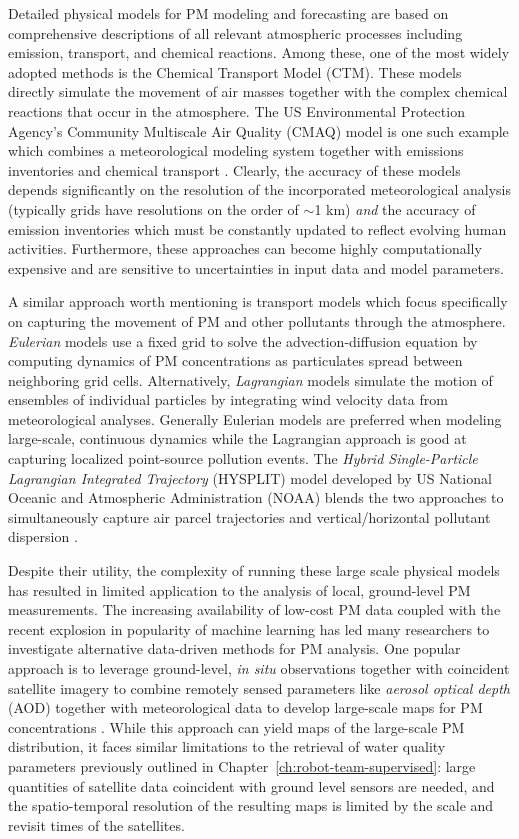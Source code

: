 Detailed physical models for PM modeling and forecasting are based on
comprehensive descriptions of all relevant atmospheric processes including
emission, transport, and chemical reactions. Among these, one of the most widely
adopted methods is the Chemical Transport Model (CTM). These models directly simulate
the movement of air masses together with the complex chemical reactions that occur in the
atmosphere. The US Environmental Protection Agency's Community Multiscale Air
Quality (CMAQ) model is one such example which combines a meteorological
modeling system together with emissions inventories and chemical transport
\cite{cmaq-overview}. Clearly, the accuracy of these models depends
significantly on the resolution of the incorporated meteorological analysis
(typically grids have resolutions on the order of $\sim$1 km) \textit{and}
the accuracy of emission inventories which must be constantly updated to reflect
evolving human activities. Furthermore, these approaches can become highly
computationally expensive and are sensitive to uncertainties in input data
and model parameters.

A similar approach worth mentioning is transport models which focus specifically
on capturing the movement of PM and other pollutants through the atmosphere.
\textit{Eulerian} models use a fixed grid to solve the advection-diffusion
equation by computing dynamics of PM concentrations as particulates spread
between neighboring grid cells. Alternatively, \textit{Lagrangian} models
simulate the motion of ensembles of individual particles by integrating wind
velocity data from meteorological analyses. Generally Eulerian models are
preferred when modeling large-scale, continuous dynamics while the Lagrangian
approach is good at capturing localized point-source pollution events. The
\textit{Hybrid Single-Particle Lagrangian Integrated Trajectory} (HYSPLIT) model
developed by US National Oceanic and Atmospheric Administration (NOAA) blends
the two approaches to simultaneously capture air parcel trajectories and
vertical/horizontal pollutant dispersion
\cite{hysplit-overview}.

Despite their utility, the complexity of running these large scale physical
models has resulted in limited application to the analysis of local,
ground-level PM measurements. The increasing availability of low-cost PM data
coupled with the recent explosion in popularity of machine learning has led
many researchers to investigate alternative data-driven methods for PM
analysis. One popular approach is to leverage ground-level, \textit{in situ}
observations together with coincident satellite imagery to combine remotely sensed
parameters like \textit{aerosol optical depth} (AOD) together with
meteorological data to develop large-scale maps for PM concentrations
\cite{prabuddha-pm-satellite}. While this approach can yield maps
of the large-scale PM distribution, it faces similar limitations to the retrieval of
water quality parameters previously outlined in
Chapter~\ref{ch:robot-team-supervised}: large quantities of satellite data
coincident with ground level sensors are needed, and the spatio-temporal
resolution of the resulting maps is limited by the scale and revisit times of the
satellites.

